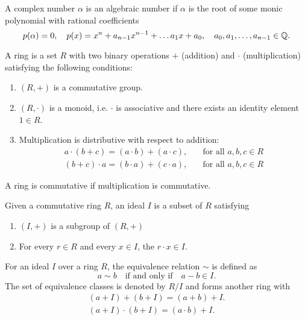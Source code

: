 \begin{definition}
  A complex number $\alpha$ is an algebraic number if $\alpha$ is the root of some monic polynomial with rational coefficients
  \[
    p(\alpha) = 0, \quad p(x) = x^n + a_{n-1} x^{n-1} + \dots a_1 x + a_0, \quad a_0, a_1, \dots, a_{n-1} \in {\mathbb Q}.
  \]
\end{definition}

\begin{definition}[Ring]
  A ring is a set $R$ with two binary operations $+$ (addition) and $\cdot$ (multiplication)
  satisfying the following conditions:
  \begin{enumerate}
    \item $(R, +)$ is a commutative group.
    \item $(R, \cdot)$ is a monoid, i.e. $\cdot$ is associative and there exists an identity element $1 \in R$.
    \item Multiplication is distributive with respect to addition:
      \begin{align*}
        a \cdot (b + c) = (a \cdot b) + (a \cdot c), & \quad \text{for all } a, b, c \in R \\
        (b + c) \cdot a = (b \cdot a) + (c \cdot a), & \quad \text{for all } a, b, c \in R
      \end{align*}
  \end{enumerate}
  A ring is commutative if multiplication is commutative.
\end{definition}

\begin{definition}[Ideal]
  Given a commutative ring $R$, an ideal $I$ is a subset of $R$ satisfying
  \begin{enumerate}
    \item $(I, +)$ is a subgroup of $(R, +)$
    \item For every $r \in R$ and every $x \in I$, the $r \cdot x \in I$.
  \end{enumerate}
\end{definition}

\begin{definition}
  For an ideal $I$ over a ring $R$, the equivalence relation $\sim$ is defined as
  \[
    a \sim b \quad \text{if and only if} \quad a - b \in I.
  \]
  The set of equivalence classes is denoted by $R/I$ and forms another ring with
  \begin{align*}
    (a + I) + (b + I) = (a + b) + I. \\
    (a + I) \cdot (b + I) = (a \cdot b) + I.
  \end{align*}
\end{definition}

